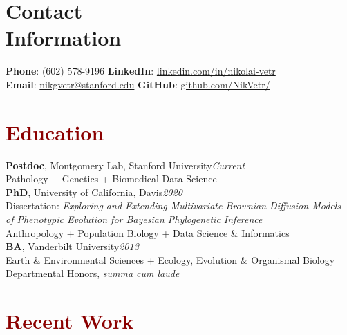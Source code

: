 \documentclass[11pt,margin,line]{resume}
\begin{document}
\name{\huge \textcolor{DarkRed}{Nikolai G. Vetr}}
\begin{resume}
\vspace{-5mm}
\section{\mysidestyle Contact\\Information}
    \textbf{Phone}: (602) 578-9196       \hfill \textbf{LinkedIn}: \href{https://www.linkedin.com/in/nikolai-vetr}{linkedin.com/in/nikolai-vetr} \\
\noindent \textbf{Email}: \href{mailto:nikgvetr@stanford.edu}{nikgvetr@stanford.edu}  \hfill \textbf{GitHub}: \href{https://www.github.com/NikVetr/}{github.com/NikVetr/} \vspace{0mm}\\\vspace{-6.5mm}

\section{\large\textcolor{DarkRed}{Education}}

\textbf{Postdoc}, Montgomery Lab, Stanford University\hfill\emph{Current}\\
Pathology + Genetics + Biomedical Data Science
\vspace{-1em}\\

\textbf{PhD}, University of California, Davis\hfill\emph{2020}\\
Dissertation: \textit{Exploring and Extending Multivariate Brownian Diffusion Models\\\hspace*{22mm} of Phenotypic Evolution for Bayesian Phylogenetic Inference}\\
Anthropology + Population Biology + Data Science \& Informatics
\vspace{-1em}\\

\textbf{BA}, Vanderbilt University\hfill\emph{2013}\\
Earth \& Environmental Sciences + Ecology, Evolution \& Organismal Biology\\
Departmental Honors, \textit{summa cum laude}\\
\vspace{-1.5em}

\section{\large\textcolor{DarkRed}{Recent Work}}


\end{resume}
\end{document}
